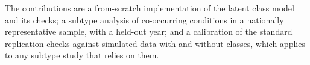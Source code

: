 The contributions are a from-scratch implementation of the latent class model and its checks; a subtype analysis of co-occurring conditions in a nationally representative sample, with a held-out year; and a calibration of the standard replication checks against simulated data with and without classes, which applies to any subtype study that relies on them.
